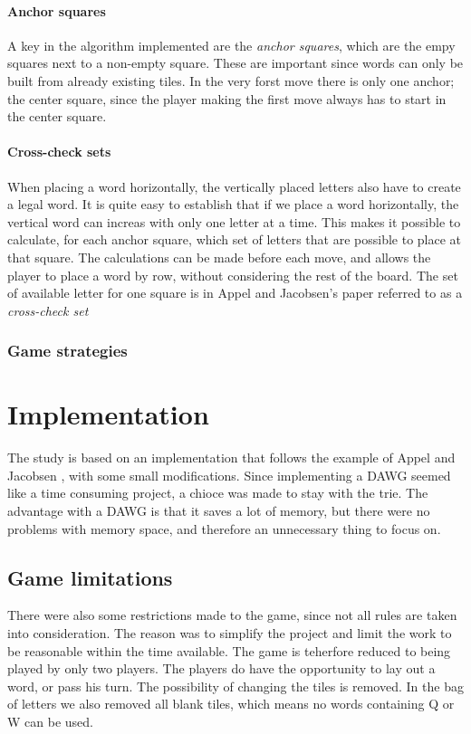 \documentclass[a4paper, 12pt]{report}
\begin{document}
\subsubsection{Anchor squares}
A key in the algorithm implemented are the \emph{anchor squares}, which are the empy squares next to a non-empty square. These are important since words can only be built from already existing tiles. In the very forst move there is only one anchor; the center square, since the player making the first move always has to start in the center square.

\subsubsection{Cross-check sets}
When placing a word horizontally, the vertically placed letters also have to create a legal word. It is quite easy to establish that if we place a word horizontally, the vertical word can increas with only one letter at a time. This makes it possible to calculate, for each anchor square, which set of letters that are possible to place at that square. The calculations can be made before each move, and allows the player to place a word by row, without considering the rest of the board. The set of available letter for one square is in Appel and Jacobsen's paper \cite{fastest} referred to as a \emph{cross-check set}

\subsection{Game strategies}

\chapter{Implementation}
The study is based on an implementation that follows the example of Appel and Jacobsen \cite{fastes}, with some small modifications. Since implementing a DAWG seemed like a time consuming project, a chioce was made to stay with the trie. The advantage with a DAWG is that it saves a lot of memory, but there were no problems with memory space, and therefore an unnecessary thing to focus on.

\section{Game limitations}
There were also some restrictions made to the game, since not all rules are taken into consideration. The reason was to simplify the project and limit the work to be reasonable within the time available. The game is teherfore reduced to being played by only two players. The players do have the opportunity to lay out a word, or pass his turn. The possibility of changing the tiles is removed. In the bag of letters we also removed all blank tiles, which means no words containing Q or W can be used.
\end{document}
